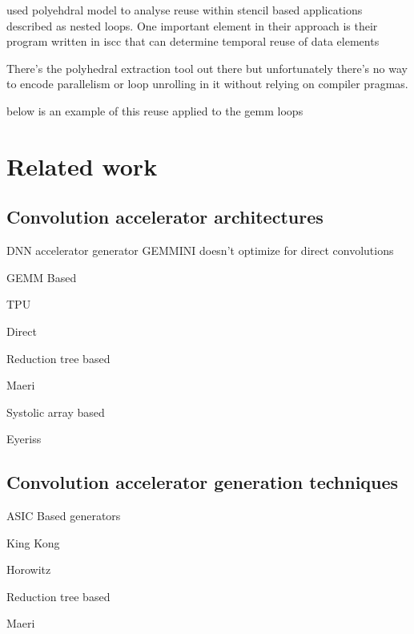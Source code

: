 \cite{meeus} used polyehdral model to analyse reuse within stencil based applications described
as nested loops. One important element in their approach is their program written in iscc that
can determine temporal reuse of data elements

There's the polyhedral extraction tool out there but unfortunately there's no
way to encode parallelism or loop unrolling in it without relying on compiler
pragmas. 

below is an example of this reuse applied to the gemm loops




\section{Related work}
\label{chap:related_work}

\subsection{Convolution accelerator architectures}
 
DNN accelerator generator GEMMINI doesn't optimize for direct convolutions

GEMM Based 

TPU 

Direct 

Reduction tree based 

Maeri 

Systolic array based 

Eyeriss 
 
\subsection{Convolution accelerator generation techniques}

ASIC Based generators 

King Kong 

Horowitz 

Reduction tree based 

Maeri 

 

